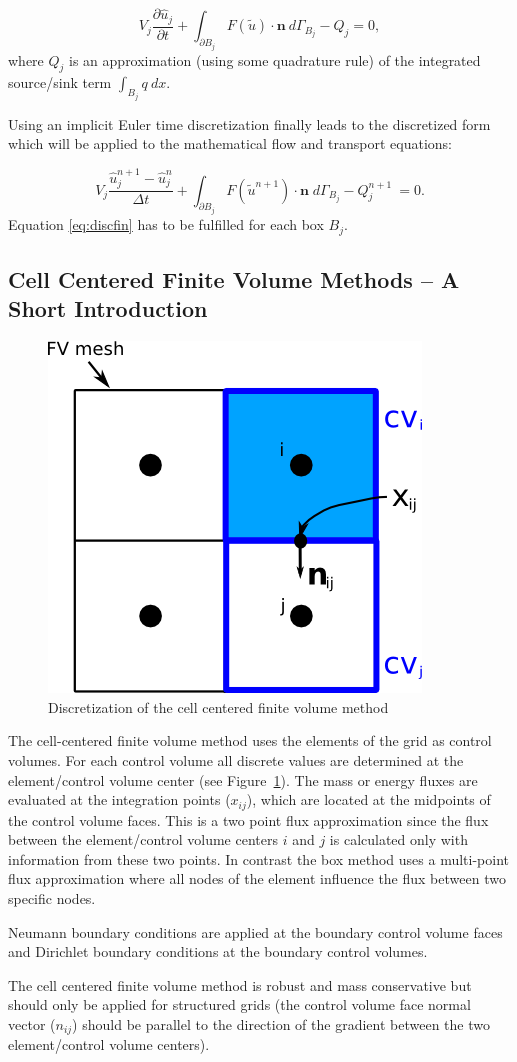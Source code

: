 \begin{equation}
\label{eq:disc1}
	V_j \frac{\partial \hat u_j}{\partial t}
	+  \int_{\partial B_j}  F(\tilde u) \cdot \mathbf n \: d\varGamma_{B_j} - Q_j = 0,
\end{equation}
where $Q_j$ is an approximation (using some quadrature rule) of the integrated source/sink term $\int_{B_j} q \: dx$.

Using an implicit Euler time discretization finally
leads to the discretized form which will be applied to the mathematical
flow and transport equations:

\begin{equation}
\label{eq:discfin}
	V_j \frac{\hat u_j^{n+1} - \hat u_j^{n}}{\Delta t}
	+ \int_{\partial B_j}  F(\tilde u^{n+1}) \cdot \mathbf n
	\;  d{\varGamma}_{B_j} - Q_j^{n+1} \: = 0.
\end{equation}
Equation \eqref{eq:discfin} has to be fulfilled for each box $B_j$.

\subsection{Cell Centered Finite Volume Methods -- A Short Introduction}\label{cc}

\begin{figure} [ht]
\centering
\includegraphics[width=0.4\linewidth,keepaspectratio]{png/cc_disc.png}
\caption{\label{pc:cc} Discretization of the cell centered finite volume method}
\end{figure}

The cell-centered finite volume method uses the elements of the grid as control volumes.
For each control volume all discrete values are determined at the element/control
volume center (see Figure~\ref{pc:cc}).
The mass or energy fluxes are evaluated at the integration points ($x_{ij}$),
which are located at the midpoints of the control
volume faces. This is a two point flux approximation since the flux between
the element/control volume centers $i$ and $j$ is calculated
only with information from these two points. In contrast the box method uses
a multi-point flux approximation where all nodes of the
element influence the flux between two specific nodes. \par
Neumann boundary conditions are applied at the boundary control volume faces
and Dirichlet boundary conditions at the boundary control volumes. \par
The cell centered finite volume method is robust and mass conservative but
should only be applied for structured grids
(the control volume face normal vector ($n_{ij}$) should be parallel to the
direction of the gradient between the two element/control
volume centers).

